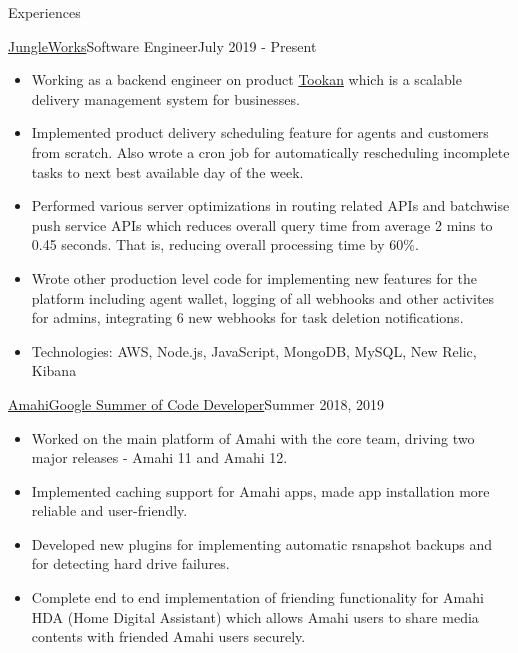 \documentclass[]{mcdowellcv}
\begin{document}
	\makeheader
	
	\begin{cvsection}{Experiences}
	    \begin{cvsubsection}{\href {https://jungleworks.com/}{JungleWorks}}{Software Engineer}{July 2019 - Present}
			\begin{itemize}
				\item Working as a backend engineer on product \href {https://jungleworks.com/tookan/}{Tookan} which is a scalable delivery management system for businesses.
                \item Implemented product delivery scheduling feature for agents and customers from scratch. Also wrote a cron job for automatically rescheduling incomplete tasks to next best available day of the week.
                \item Performed various server optimizations in routing related APIs and batchwise push service APIs which reduces overall query time from average 2 mins to 0.45 seconds. That is, reducing overall processing time by 60\%.
                \item Wrote other production level code for implementing new features for the platform including agent wallet, logging of all webhooks and other activites for admins, integrating 6 new webhooks for task deletion notifications. 
                \item Technologies: AWS, Node.js, JavaScript, MongoDB, MySQL, New Relic, Kibana
			\end{itemize}
		\end{cvsubsection}
		\begin{cvsubsection}{\href {https://www.amahi.org/}{Amahi}}{\href {https://summerofcode.withgoogle.com/}{Google Summer of Code Developer}}{Summer 2018, 2019}
			\begin{itemize}
				\item Worked on the main platform of Amahi with the core team, driving two major releases - Amahi 11 and Amahi 12.
				\item Implemented caching support for Amahi apps, made app installation more reliable and user-friendly.
				\item Developed new plugins for implementing automatic rsnapshot backups and for detecting hard drive failures.
				\item Complete end to end implementation of friending functionality for Amahi HDA (Home Digital Assistant) which allows Amahi users to share media contents with friended Amahi users securely.

\end{itemize}
\end{cvsubsection}
\end{cvsection}
\end{document}
